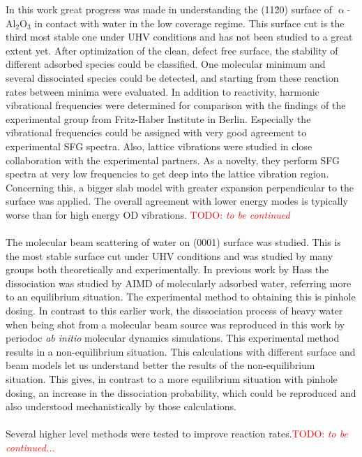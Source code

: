 \documentclass[11pt,DIV=13,BCOR=5mm,a4paper,headinclude]{scrbook}
\newcommand\todo[1]{\textcolor{red}{TODO: \textit{{#1}}}}
\begin{document}

In this work great progress was made in understanding the (11\=20) surface of $\upalpha$-Al$_2$O$_3$ in contact with water in the low coverage regime.
This surface cut is the third most stable one under UHV conditions and has not been studied to a great extent yet.
After optimization of the clean, defect free surface, the stability of different adsorbed species could be classified.
One molecular minimum and several dissociated species could be detected, and starting from these reaction rates between minima were evaluated.
In addition to reactivity, harmonic vibrational frequencies were determined for comparison with the findings of the experimental group from Fritz-Haber Institute in Berlin.
Especially the vibrational frequencies could be assigned with very good agreement to experimental SFG spectra.
Also, lattice vibrations were studied in close collaboration with the experimental partners.
As a novelty, they perform SFG spectra at very low frequencies to get deep into the lattice vibration region.
Concerning this, a bigger slab model with greater expansion perpendicular to the surface was applied.
The overall agreement with lower energy modes is typically worse than for high energy OD vibrations.
\todo{to be continued}
\\\\
The molecular beam scattering of water on (0001) surface was studied.
This is the most stable surface cut under UHV conditions and was studied by many groups both theoretically and experimentally.
In previous work by Hass the dissociation was studied by AIMD of molecularly adsorbed water, referring more to an equilibrium situation.
The experimental method to obtaining this is pinhole dosing.
In contrast to this earlier work, the dissociation process of heavy water when being shot from a molecular beam source was reproduced in this work by periodoc \textit{ab initio} molecular dynamics simulations.
This experimental method results in a non-equilibrium situation.
This calculations with different surface and beam models let us understand better the results of the non-equilibrium situation.
This gives, in contrast to a more equilibrium situation with pinhole dosing, an increase in the dissociation probability, which could be reproduced and also understood mechanistically by those calculations.
\\\\
Several higher level methods were tested to improve reaction rates.\todo{to be continued...}
\end{document}
